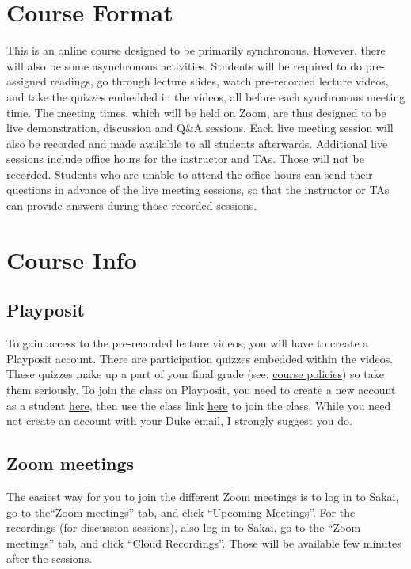 \documentclass[11pt, a4paper]{article}
\begin{document}
\section{Course Format}
This is an online course designed to be primarily synchronous. However, there will also be some asynchronous activities. Students will be required to do pre-assigned readings, go through lecture slides, watch pre-recorded lecture videos, and take the quizzes embedded in the videos, all before each synchronous meeting time. The meeting times, which will be held on Zoom, are thus designed to be live demonstration, discussion and Q\&A sessions. Each live meeting session will also be recorded and made available to all students afterwards. Additional live sessions include office hours for the instructor and TAs. Those will not be recorded. Students who are unable to attend the office hours can send their questions in advance of the live meeting sessions, so that the instructor or TAs can provide answers during those recorded sessions.

\section{Course Info}
\subsection{Playposit}
To gain access to the pre-recorded lecture videos, you will have to create a Playposit account. There are participation quizzes embedded within the videos. These quizzes make up a part of your final grade (see: \href{https://ids-702-f20.github.io/Course-Website/policies/}{course policies}) so take them seriously. To join the class on Playposit, you need to create a new account as a student \href{https://www.playposit.com/join}{here}, then use the class link \href{https://www.playposit.com/join-class/1403540-929415}{here} to join the class. While you need not create an account with your Duke email, I strongly suggest you do.

\subsection{Zoom meetings}
The easiest way for you to join the different Zoom meetings is to log in to Sakai, go to the``Zoom meetings'' tab, and click ``Upcoming Meetings''. For the recordings (for discussion sessions), also log in to Sakai, go to the ``Zoom meetings'' tab, and click ``Cloud Recordings''. Those will be available few minutes after the sessions.
\end{document}
